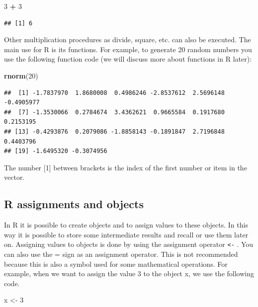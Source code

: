 \documentclass[]{book}
\newenvironment{Shaded}{\begin{snugshade}}{\end{snugshade}}
\newcommand{\KeywordTok}[1]{\textcolor[rgb]{0.13,0.29,0.53}{\textbf{#1}}}
\newcommand{\DecValTok}[1]{\textcolor[rgb]{0.00,0.00,0.81}{#1}}
\newcommand{\StringTok}[1]{\textcolor[rgb]{0.31,0.60,0.02}{#1}}
\newcommand{\OperatorTok}[1]{\textcolor[rgb]{0.81,0.36,0.00}{\textbf{#1}}}
\newcommand{\NormalTok}[1]{#1}
\theoremstyle{definition}
\theoremstyle{definition}
\theoremstyle{definition}
\theoremstyle{remark}
\begin{document}
\begin{Shaded}
\begin{Highlighting}[]
\DecValTok{3} \OperatorTok{+}\StringTok{ }\DecValTok{3}
\end{Highlighting}
\end{Shaded}

\begin{verbatim}
## [1] 6
\end{verbatim}

Other multiplication procedures as divide, square, etc. can also be
executed. The main use for R is its functions. For example, to generate
20 random numbers you use the following function code (we will discuss
more about functions in R later):

\begin{Shaded}
\begin{Highlighting}[]
\KeywordTok{rnorm}\NormalTok{(}\DecValTok{20}\NormalTok{)}
\end{Highlighting}
\end{Shaded}

\begin{verbatim}
##  [1] -1.7837970  1.8680008  0.4986246 -2.8537612  2.5696148 -0.4905977
##  [7] -1.3530066  0.2784674  3.4362621  0.9665584  0.1917680  0.2153195
## [13] -0.4293876  0.2079086 -1.8858143 -0.1891847  2.7196848  0.4403796
## [19] -1.6495320 -0.3074956
\end{verbatim}

The number {[}1{]} between brackets is the index of the first number or
item in the vector.

\subsection{R assignments and objects}\label{r-assignments-and-objects}

In R it is possible to create objects and to assign values to these
objects. In this way it is possible to store some intermediate results
and recall or use them later on. Assigning values to objects is done by
using the assignment operator \texttt{\textless{}-} . You can also use
the = sign as an assignment operator. This is not recommended because
this is also a symbol used for some mathematical operations. For
example, when we want to assign the value 3 to the object x, we use the
following code.

\begin{Shaded}
\begin{Highlighting}[]
\NormalTok{x <-}\StringTok{ }\DecValTok{3} 
\end{Highlighting}
\end{Shaded}
\end{document}
